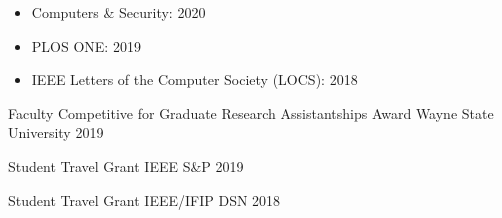 \begin{itemize}[leftmargin=15pt]
\item[\space] Computers \& Security: 2020
\item[\space] PLOS ONE: 2019
\item[\space] IEEE Letters of the Computer Society (LOCS): 2018
\end{itemize}

\begin{cvhonors}

  \cvhonor
    {Faculty Competitive for Graduate Research Assistantships Award} %
    {Wayne State University} %
    {} %
    {2019} %
   
   \cvhonor
    {Student Travel Grant} %
    {IEEE S\&P} %
    {} %
    {2019} %
    
  \cvhonor
    {Student Travel Grant} %
    {IEEE/IFIP DSN} %
    {} %
    {2018} %
\end{cvhonors}

\iffalse
\cvsection{Professional Referees}
\begin{cventries}
  \cventry
    {Department of Computer Science and Engineering, Southern University of Science and Technology} %
    {Fengwei Zhang, zhangfw@sustech.edu.cn, \textit{Advisor}} %
    {} %
    {} %
    {}
    \vspace{-5pt}
   \cventry
    {Department of Computer Science, Wayne State University} %
    {Weisong Shi, weisong@wayne.edu, \textit{Dissertation Committee Member}} %
    {} %
    {} %
    {}
    \vspace{-5pt}
   \cventry
    {Department of Computer Science and Engineering, The Ohio State University} %
    {Yinqian Zhang, yinqian@cse.ohio-state.edu, \textit{Collaborator}} %
    {} %
    {} %
    {}
    \vspace{-5pt}
   \cventry
    {Department of Computer Science, Wayne State University} %
    {Dongxiao Zhu, dzhu@wayne.edu, \textit{Dissertation Committee Member}} %
    {} %
    {} %
    {}
\end{cventries}
\fi